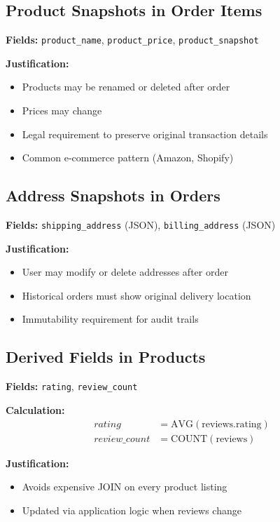 \documentclass[12pt,a4paper]{report}
\begin{document}
\subsection{Product Snapshots in Order Items}

\textbf{Fields:} \texttt{product\_name}, \texttt{product\_price}, \texttt{product\_snapshot}

\textbf{Justification:}
\begin{itemize}
    \item Products may be renamed or deleted after order
    \item Prices may change
    \item Legal requirement to preserve original transaction details
    \item Common e-commerce pattern (Amazon, Shopify)
\end{itemize}

\subsection{Address Snapshots in Orders}

\textbf{Fields:} \texttt{shipping\_address} (JSON), \texttt{billing\_address} (JSON)

\textbf{Justification:}
\begin{itemize}
    \item User may modify or delete addresses after order
    \item Historical orders must show original delivery location
    \item Immutability requirement for audit trails
\end{itemize}

\subsection{Derived Fields in Products}

\textbf{Fields:} \texttt{rating}, \texttt{review\_count}

\textbf{Calculation:}
\begin{align}
    rating &= \text{AVG}(\text{reviews.rating}) \\
    review\_count &= \text{COUNT}(\text{reviews})
\end{align}

\textbf{Justification:}
\begin{itemize}
    \item Avoids expensive JOIN on every product listing
    \item Updated via application logic when reviews change
\end{itemize}
\end{document}
